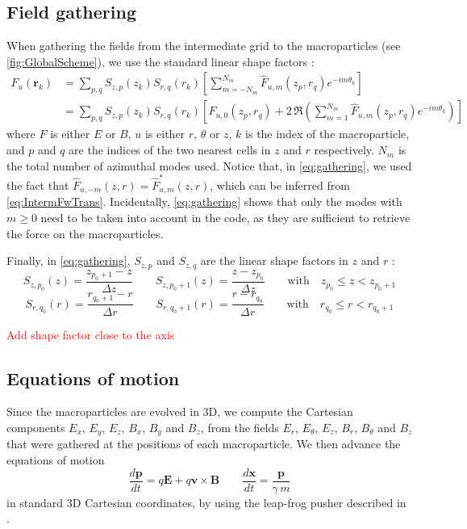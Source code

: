 \documentclass[a4paper]{article}   	%
\renewcommand{\vec}[1]{\boldsymbol{#1}}
\newcommand{\comment}[1]{\textcolor{red}{#1}}
\begin{document}
\subsection{Field gathering}

When gathering the fields from the intermediate grid to the
macroparticles (see \cref{fig:GlobalScheme}),
we use the standard linear shape factors :
\begin{align} 
F_u(\vec{r}_k) &=  \sum_{p,q} S_{z,p}(z_k)S_{r,q}(r_k) \left[ \sum_{m=-N_m}^{N_m} \hat{F}_{u,m}(z_p, r_q)
  e^{-im\theta_k} \right] \\
& = \sum_{p,q} S_{z,p}(z_k)S_{r,q}(r_k) \left[ \hat{F}_{u,0}(z_p,
  r_q) + 2\,\Re \left( \sum_{m=1}^{N_m} \hat{F}_{u,m}(z_p, r_q)
  e^{-im\theta_k} \right) \right] \label{eq:gathering}
\end{align}
where $F$ is either $E$ or $B$, $u$ is either $r$, $\theta$ or $z$, $k$ is the index of the macroparticle,
and $p$ and $q$ are the indices of the two nearest cells in $z$ and
$r$ respectively. $N_m$ is the total number
of azimuthal modes used. Notice that, in \cref{eq:gathering}, we used the fact that
$\hat{F}_{u,-m}(z,r) = \hat{F}^*_{u,m}(z,r) $, which can be
inferred from \cref{eq:IntermFwTrans}. Incidentally, \cref{eq:gathering} shows that only the modes
with $m\geq 0$ need to be taken into account in the code, as they are 
sufficient to retrieve the force on the macroparticles.

Finally, in \cref{eq:gathering}, $S_{z,p}$ and $S_{z,q}$ are the linear
shape factors in $z$ and $r$ :
\[ S_{z,p_0}(z) = \frac{z_{p_0+1}- z}{\Delta z}  \qquad 
S_{z,p_0 +1}(z) = \frac{ z - z_{p_0} }{\Delta z} \qquad
\mathrm{with} \quad z_{p_0} \leq z < z_{p_0 +1}  \]
\[ S_{r,q_0}(r) = \frac{ r_{q_0+1} - r }{  \Delta r }
\qquad S_{r,q_0+1}(r) = \frac{ r - r_{q_0} }{  \Delta r }
\qquad \mathrm{with} \quad r_{q_0} \leq r < r_{q_0+1}
 \]

\comment{Add shape factor close to the axis}

\subsection{Equations of motion}

Since the macroparticles are evolved in 3D, we compute
the Cartesian components $E_x$, $E_y$, $E_z$, $B_x$, $B_y$ and
$B_z$, from the fields $E_r$, $E_\theta$, $E_z$, $B_r$, $B_\theta$ and
$B_z$ that were gathered at the positions of each macroparticle. 
We then advance the equations of motion
\[ \frac{d\vec{p}}{dt} = q\vec{E} + q\vec{v}\times \vec{B} \qquad
\frac{d\vec{x}}{dt} = \frac{\vec{p}}{\gamma \,m} \]
\noindent  in standard 3D Cartesian coordinates, by using the leap-frog pusher described in \citep{VayPoP2008}.
\end{document}
